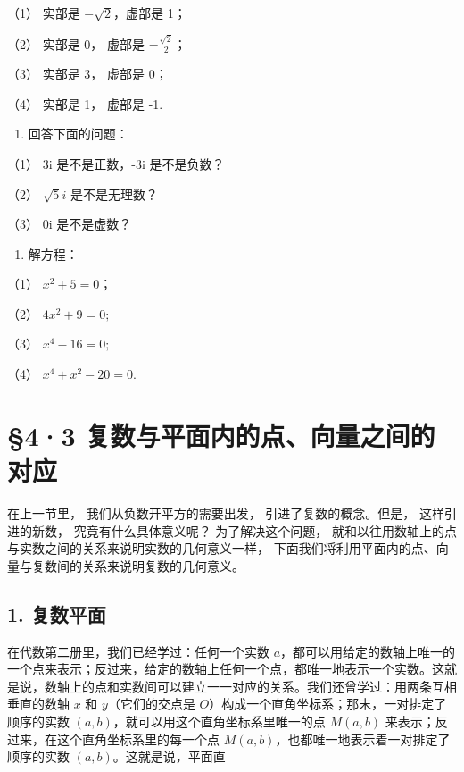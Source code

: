 （1） 实部是 \(-\sqrt{2}\)，虚部是 1；

（2） 实部是 0， 虚部是 \(-\frac{\sqrt{2}}{2}\)；

（3） 实部是 3， 虚部是 0；

（4） 实部是 1， 虚部是 -1.

\begin{enumerate}[start=3]
\item
  回答下面的问题：
\end{enumerate}

（1） 3i 是不是正数，-3i 是不是负数？

（2） \(\sqrt{5} i\) 是不是无理数？

（3） 0i 是不是虚数？

\begin{enumerate}[start=4]
\item
  解方程：
\end{enumerate}

（1） \(x^{2} + 5 = 0\)；

（2） \(4x^{2} + 9 = 0;\)

（3） \(x^{4} - 16 = 0;\)

（4） \(x^{4} + x^{2} - 20 = 0.\)

\section{§4·3 复数与平面内的点、向量之间的对应}

在上一节里， 我们从负数开平方的需要出发， 引进了复数的概念。但是，
这样引进的新数， 究竟有什么具体意义呢？ 为了解决这个问题，
就和以往用数轴上的点与实数之间的关系来说明实数的几何意义一样，
下面我们将利用平面内的点、向量与复数间的关系来说明复数的几何意义。

\subsection{1. 复数平面}

在代数第二册里，我们已经学过：任何一个实数
\(a\)，都可以用给定的数轴上唯一的一个点来表示；反过来，给定的数轴上任何一个点，都唯一地表示一个实数。这就是说，数轴上的点和实数间可以建立一一对应的关系。我们还曾学过：用两条互相垂直的数轴
\(x\) 和 \(y\)（它们的交点是
\(O\)）构成一个直角坐标系；那末，一对排定了顺序的实数
\((a, b)\)，就可以用这个直角坐标系里唯一的点 \(M(a, b)\)
来表示；反过来，在这个直角坐标系里的每一个点
\(M(a, b)\)，也都唯一地表示着一对排定了顺序的实数
\((a, b)\)。这就是说，平面直

